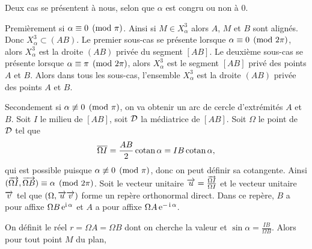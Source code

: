 Deux cas se présentent à nous, selon que $\alpha$ est congru ou non à 0.

Premièrement si $\alpha \equiv 0 \pmod {\pi}$. Ainsi si $M \in X_\alpha^3$ alors $A$, $M$ et $B$ sont alignés. Donc $X_\alpha^3 \subset (AB)$. Le premier sous-cas se présente lorsque $\alpha \equiv 0 \pmod {2\pi}$, alors $X_\alpha^3$ est la droite $(AB)$ privée du segment $[AB]$. Le deuxième sous-cas se présente lorsque $\alpha \equiv \pi \pmod {2\pi}$, alors  $X_\alpha^3$ est le segment $[AB]$ privé des points $A$ et $B$.  Alors dans tous les sous-cas, l'ensemble $X_\alpha^3$ est la droite $(AB)$ privée des points $A$ et $B$.

Secondement si  $\alpha \not\equiv 0 \pmod {\pi}$, on va obtenir un arc de cercle d'extrémités $A$ et $B$. Soit $I$ le milieu de $[AB]$, soit $\mathcal{D}$ la médiatrice de $[AB]$. Soit $\Omega$ le point de $\mathcal{D}$ tel que
\begin{equation}
  \overline{\Omega I}=\frac{AB}{2}\operatorname{cotan} \alpha=IB \operatorname{cotan} \alpha,
\end{equation}
qui est possible puisque $\alpha \not\equiv 0 \pmod {\pi}$, donc on peut définir sa cotangente. Ainsi $(\overrightarrow{\Omega I},\overrightarrow{\Omega B}) \equiv \alpha \pmod {2\pi}$. Soit le vecteur unitaire $\overrightarrow{u}=\frac{\overrightarrow{\Omega I}}{\Omega I}$ et le vecteur unitaire $\overrightarrow{v}$ tel que $(\Omega, \overrightarrow{u} \overrightarrow{v})$ forme un repère orthonormal direct. Dans ce repère, $B$ a pour affixe $\Omega B \operatorname{e}^{\operatorname{i} \alpha}$ et $A$ a pour affixe $\Omega A \operatorname{e}^{-\operatorname{i} \alpha}$.

On définit le réel $r=\Omega A=\Omega B$ dont on cherche la valeur et $\sin \alpha = \frac{IB}{\Omega B}$. Alors pour tout point $M$ du plan,


